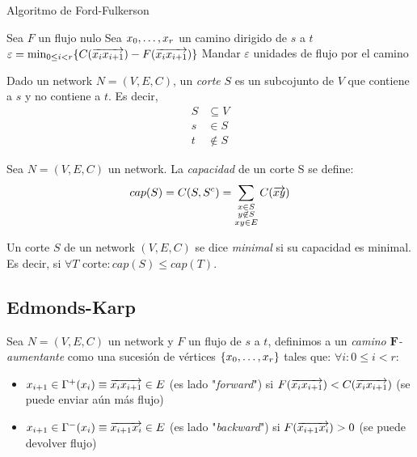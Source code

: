 \begin{algorithm}
  \caption{Algoritmo de Ford-Fulkerson}
  \begin{algorithmic}
    \State Sea $F$ un flujo nulo
    \State Sea $x_0, \mathellipsis, x_r$ un camino dirigido de $s$ a $t$
    \State $\varepsilon = \min_{0 \le i < r} \{C(\overrightarrow{x_i x_{i+1}}) - F(\overrightarrow{x_i x_{i+1}})\}$
    \State Mandar $\varepsilon$ unidades de flujo por el camino
    \EndWhile
    \EndFunction
  \end{algorithmic}
\end{algorithm}

\begin{definition}
  Dado un network $N = (V, E, C)$, un \emph{corte} $S$ es un subcojunto de $V$
  que contiene a $s$ y no contiene a $t$. Es decir,
  \begin{align}
    S &\subseteq V\\
    s &\in S\\
    t &\not\in S
  \end{align}
\end{definition}

\begin{definition}
  Sea $N = (V, E, C)$ un network. La \emph{capacidad} de un corte S se define:
  \begin{align}
    cap(S) = C(S, S^c) = \sum_{\substack{x\in S \\ y \not\in S \\ xy \in E}} C(\overrightarrow{xy})
  \end{align}
\end{definition}

\begin{definition}
  Un corte $S$ de un network $(V, E, C)$ se dice \emph{minimal} si su
  capacidad es minimal. Es decir, si
  $\forall T \text{ corte} \colon cap(S) \le cap(T)$.
\end{definition}


\subsection{Edmonds-Karp}

\begin{definition}
Sea $N = (V,E,C)$ un network y $F$ un flujo de $s$ a $t$, definimos a un \emph{camino $\boldsymbol{F}$-aumentante} como una sucesión de vértices $\{x_0,\mathellipsis, x_r\}$ tales que: $\forall i: 0 \le i < r :$
\begin{itemize}
    \item
    $x_{i+1} \in \Gamma^{+}(x_i) \equiv \overrightarrow{x_i x_{i+1}} \in E$ (es lado "\emph{forward}") si $F(\overrightarrow{x_i x_{i+1}}) < C(\overrightarrow{x_i x_{i+1}})$ (se puede enviar aún más flujo)
    \item
    $x_{i+1} \in \Gamma^{-}(x_i) \equiv \overrightarrow{x_{i+1} x_i} \in E$ (es lado "\emph{backward}") si $F(\overrightarrow{x_{i+1} x_i}) > 0$ (se puede devolver flujo)
\end{itemize}
\end{definition}

